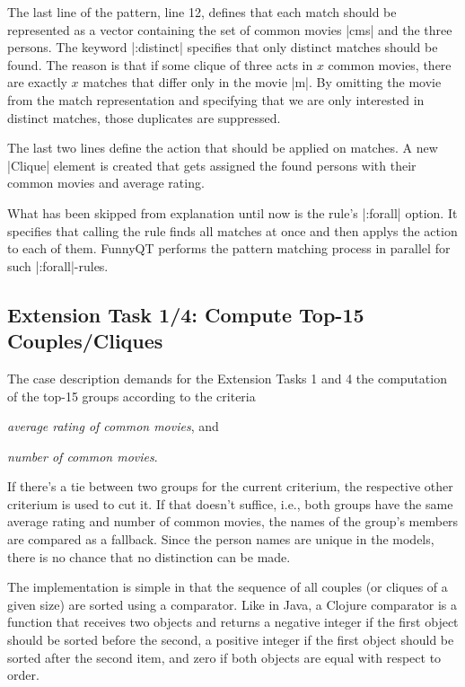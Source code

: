 \documentclass[submission]{eptcs}
\newcommand{\code}{\clojureinline}
\begin{document}
The last line of the pattern, line 12, defines that each match should be
represented as a vector containing the set of common movies \code|cms| and the
three persons.  The keyword \code|:distinct| specifies that only distinct
matches should be found.  The reason is that if some clique of three acts in
\(x\)
common movies, there are exactly \(x\)
matches that differ only in the movie \code|m|.  By omitting the movie from the
match representation and specifying that we are only interested in distinct
matches, those duplicates are suppressed.

The last two lines define the action that should be applied on matches.  A new
\code|Clique| element is created that gets assigned the found persons with
their common movies and average rating.

What has been skipped from explanation until now is the rule's \code|:forall|
option.  It specifies that calling the rule finds all matches at once and then
applys the action to each of them.  FunnyQT performs the pattern matching
process in parallel for such \code|:forall|-rules.


\subsection{Extension Task 1/4: Compute Top-15 Couples/Cliques}
\label{sec:ext-task-1:top-15}

The case description demands for the Extension Tasks 1 and 4 the computation of
the top-15 groups according to the criteria
\begin{inparaenum}[(a)]
\item \emph{average rating of common movies}, and
\item \emph{number of common movies}.
\end{inparaenum}
If there's a tie between two groups for the current criterium, the respective
other criterium is used to cut it.  If that doesn't suffice, i.e., both groups
have the same average rating and number of common movies, the names of the
group's members are compared as a fallback.  Since the person names are unique
in the models, there is no chance that no distinction can be made.

The implementation is simple in that the sequence of all couples (or cliques of
a given size) are sorted using a comparator.  Like in Java, a Clojure
comparator is a function that receives two objects and returns a negative
integer if the first object should be sorted before the second, a positive
integer if the first object should be sorted after the second item, and zero if
both objects are equal with respect to order.
\end{document}
